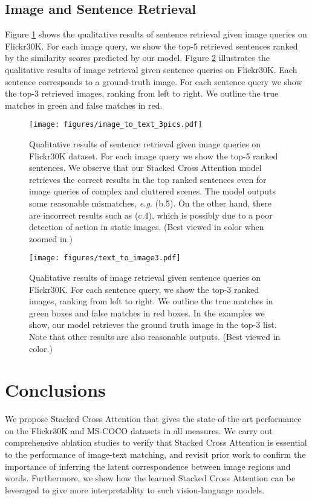 \documentclass[runningheads]{llncs}
\begin{document}
\subsection{Image and Sentence Retrieval}
Figure \ref{fig:img_2_txt} shows the qualitative results of sentence retrieval given image queries on Flickr30K. For each image query, we show the top-5 retrieved sentences ranked by the similarity scores predicted by our model. Figure \ref{fig:txt_2_im} illustrates the qualitative results of image retrieval given sentence queries on Flickr30K. Each sentence corresponds to a ground-truth image. For each sentence query we show the top-3 retrieved images, ranking from left to right. We outline the true matches in green and false matches in red. 


\begin{figure}[t!]
\centering
\texttt{[image: figures/image\_to\_text\_3pics.pdf]}
\caption{Qualitative results of sentence retrieval given image queries on Flickr30K dataset. For each image query we show the top-5 ranked sentences. We observe that our Stacked Cross Attention model retrieves the correct results in the top ranked sentences even for image queries of complex and cluttered scenes. The model outputs some reasonable mismatches, {\em e.g.} (b.5). On the other hand, there are incorrect results such as (c.4), which is possibly due to a poor detection of action in static images. (Best viewed in color when zoomed in.)}
\label{fig:img_2_txt}
\end{figure}

\begin{figure}[t!]
\centering
\texttt{[image: figures/text\_to\_image3.pdf]}
\caption{Qualitative results of image retrieval given sentence queries on Flickr30K. For each sentence query, we show the top-3 ranked images, ranking from left to right. We outline the true matches in green boxes and false matches in red boxes. In the examples we show, our model retrieves the ground truth image in the top-3 list. Note that other results are also reasonable outputs. (Best viewed in color.)}
\label{fig:txt_2_im}
\end{figure}

\section{Conclusions}
We propose Stacked Cross Attention that gives the state-of-the-art performance on the Flickr30K and MS-COCO datasets in all measures. We carry out comprehensive ablation studies to verify that Stacked Cross Attention is essential to the performance of image-text matching, and revisit prior work to confirm the importance of inferring the latent correspondence between image regions and words. Furthermore, we show how the learned Stacked Cross Attention can be leveraged to give more interpretablity to such vision-language models. 
\end{document}
